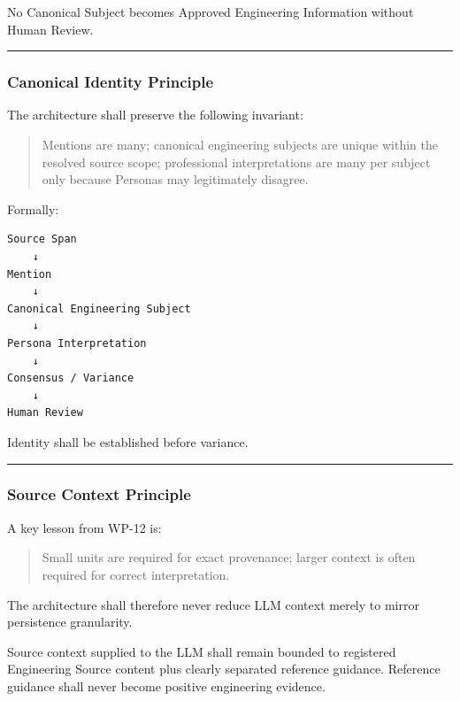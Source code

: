 No Canonical Subject becomes Approved Engineering Information without Human Review.

\begin{center}\rule{0.5\linewidth}{0.5pt}\end{center}

\hypertarget{canonical-identity-principle}{%
\subsubsection{Canonical Identity Principle}\label{canonical-identity-principle}}

The architecture shall preserve the following invariant:

\begin{quote}
Mentions are many; canonical engineering subjects are unique within the resolved source scope; professional interpretations are many per subject only because Personas may legitimately disagree.
\end{quote}

Formally:

\begin{verbatim}
Source Span
    ↓
Mention
    ↓
Canonical Engineering Subject
    ↓
Persona Interpretation
    ↓
Consensus / Variance
    ↓
Human Review
\end{verbatim}

Identity shall be established before variance.

\begin{center}\rule{0.5\linewidth}{0.5pt}\end{center}

\hypertarget{source-context-principle}{%
\subsubsection{Source Context Principle}\label{source-context-principle}}

A key lesson from WP-12 is:

\begin{quote}
Small units are required for exact provenance; larger context is often required for correct interpretation.
\end{quote}

The architecture shall therefore never reduce LLM context merely to mirror persistence granularity.

Source context supplied to the LLM shall remain bounded to registered Engineering Source content plus clearly separated reference guidance. Reference guidance shall never become positive engineering evidence.

